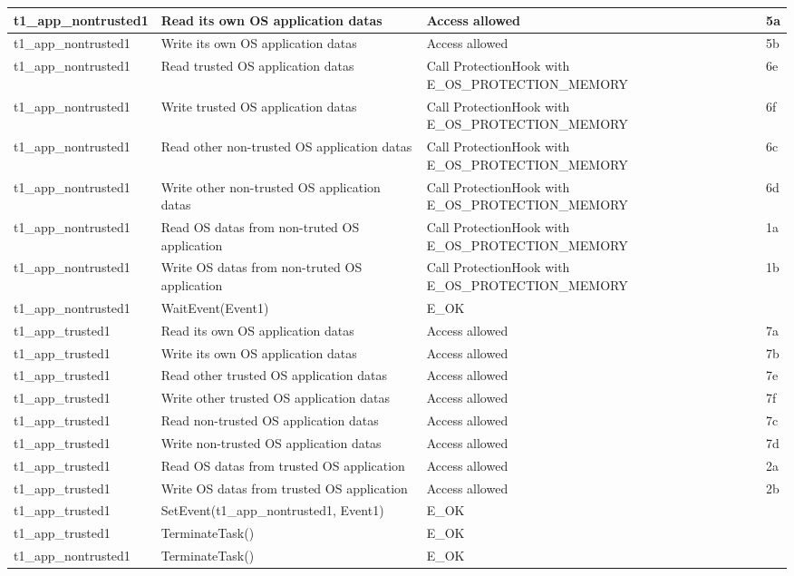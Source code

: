 \documentclass[10pt]{article}
\newlength{\Li}\settowidth{\Li}{Running}
\newlength{\Lii}\setlength{\Lii}{7cm}
\newlength{\Liiii}\setlength{\Liiii}{0.9cm}
\newlength{\Liii}\setlength{\Liii}{\textwidth} \addtolength{\Liii}{-\Li} \addtolength{\Liii}{-\Lii} \addtolength{\Liii}{-\Liiii}
\begin{document}
	\begin{supertabular}{|p{\Li}|p{\Lii}|p{\Liii}|p{\Liiii}|} \hline 
	t1\_app\_nontrusted1	& Read its own OS application datas		& Access allowed										& 5a \\ \hline
	t1\_app\_nontrusted1	& Write its own OS application datas			& Access allowed										& 5b \\ \hline
	t1\_app\_nontrusted1	& Read trusted OS application datas		& Call ProtectionHook with E\_OS\_PROTECTION\_MEMORY		& 6e \\ \hline
	t1\_app\_nontrusted1	& Write trusted OS application datas			& Call ProtectionHook with E\_OS\_PROTECTION\_MEMORY		& 6f \\ \hline
	t1\_app\_nontrusted1	& Read other non-trusted OS application datas & Call ProtectionHook with E\_OS\_PROTECTION\_MEMORY	& 6c \\ \hline
	t1\_app\_nontrusted1	& Write other non-trusted OS application datas & Call ProtectionHook with E\_OS\_PROTECTION\_MEMORY	& 6d \\ \hline
	t1\_app\_nontrusted1	& Read OS datas from non-truted OS application	& Call ProtectionHook with E\_OS\_PROTECTION\_MEMORY	& 1a \\ \hline
	t1\_app\_nontrusted1	& Write OS datas from non-truted OS application	& Call ProtectionHook with E\_OS\_PROTECTION\_MEMORY	& 1b \\ \hline
	t1\_app\_nontrusted1	& WaitEvent(Event1)							& E\_OK											& \\ \hline
	
	t1\_app\_trusted1		& Read its own OS application datas		& Access allowed										& 7a \\ \hline
	t1\_app\_trusted1		& Write its own OS application datas			& Access allowed										& 7b \\ \hline
	t1\_app\_trusted1		& Read other trusted OS application datas 	& Access allowed										& 7e \\ \hline
	t1\_app\_trusted1		& Write other trusted OS application datas 	& Access allowed										& 7f \\ \hline
	t1\_app\_trusted1		& Read non-trusted OS application datas		& Access allowed										& 7c \\ \hline
	t1\_app\_trusted1		& Write non-trusted OS application datas		& Access allowed										& 7d \\ \hline
	t1\_app\_trusted1		& Read OS datas from trusted OS application	& Access allowed										& 2a \\ \hline
	t1\_app\_trusted1		& Write OS datas from trusted OS application	& Access allowed										& 2b \\ \hline
	t1\_app\_trusted1		& SetEvent(t1\_app\_nontrusted1, Event1)		& E\_OK											& \\ \hline
	
	t1\_app\_trusted1		& TerminateTask()							& E\_OK											& \\ \hline
	t1\_app\_nontrusted1	& TerminateTask()							& E\_OK											& \\ \hline
	\end{supertabular}\\
\end{document}
